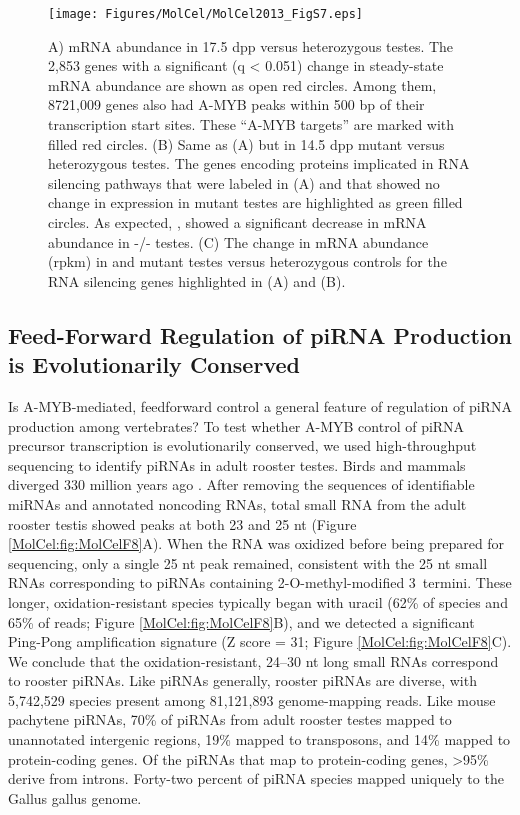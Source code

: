     \begin{figure} %
      \centering 
      \texttt{[image: Figures/MolCel/MolCel2013\_FigS7.eps]}
      \caption[\amyb{} mutants, but Not \miwi{} Mutants, Change the Expression of RNA Silencing Pathway Genes]
      {
      	A) mRNA abundance in 17.5 dpp \amyb{} versus heterozygous testes. The 2,853 genes with a significant (q < 0.051) change in steady-state mRNA abundance are shown as open red circles. Among them, 8721,009 genes also had A-MYB peaks within 500 bp of their transcription start sites. These “A-MYB targets” are marked with filled red circles. (B) Same as (A) but in 14.5 dpp \miwi{} mutant versus heterozygous testes. The genes encoding proteins implicated in RNA silencing pathways that were labeled in (A) and that showed no change in expression in \miwi{} mutant testes are highlighted as green filled circles. As expected, \miwi{}, showed a significant decrease in mRNA abundance in \miwi{}-/- testes. (C) The change in mRNA abundance (rpkm) in \amyb{} and \miwi{} mutant testes versus heterozygous controls for the RNA silencing genes highlighted in (A) and (B).
      	}
      \label{MolCel:fig:MolCelS7}
    	\end{figure}

  \subsection{Feed-Forward Regulation of piRNA Production is Evolutionarily Conserved}
    \label{MolCel:subsec:A-MYB in Chickens}

    Is A-MYB-mediated, feedforward control a general feature of regulation of piRNA production among vertebrates? To test whether A-MYB control of piRNA precursor transcription is evolutionarily conserved, we used high-throughput sequencing to identify piRNAs in adult rooster testes. Birds and mammals diverged 330 million years ago \citep{Benton2007}. After removing the sequences of identifiable miRNAs \citep{Burnside2008} and annotated noncoding RNAs, total small RNA from the adult rooster testis showed peaks at both 23 and 25 nt (Figure \ref{MolCel:fig:MolCelF8}A). When the RNA was oxidized before being prepared for sequencing, only a single 25 nt peak remained, consistent with the 25 nt small RNAs corresponding to piRNAs containing 2\textprime-O-methyl-modified 3\textprime~termini. These longer, oxidation-resistant species typically began with uracil (62\% of species and 65\% of reads; Figure \ref{MolCel:fig:MolCelF8}B), and we detected a significant Ping-Pong amplification signature (Z score = 31; Figure \ref{MolCel:fig:MolCelF8}C). We conclude that the oxidation-resistant, 24–30 nt long small RNAs correspond to rooster piRNAs. Like piRNAs generally, rooster piRNAs are diverse, with 5,742,529 species present among 81,121,893 genome-mapping reads. Like mouse pachytene piRNAs, 70\% of piRNAs from adult rooster testes mapped to unannotated intergenic regions, 19\% mapped to transposons, and 14\% mapped to protein-coding genes. Of the piRNAs that map to protein-coding genes, >95\% derive from introns. Forty-two percent of piRNA species mapped uniquely to the Gallus gallus genome.

